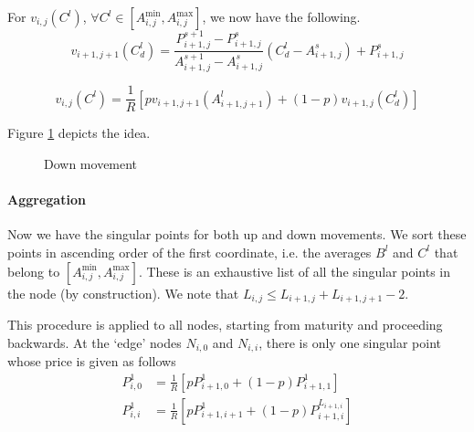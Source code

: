 For $ v_{i,j}( C^l ) $, $ \forall C^l \in \left[ A_{i,j}^{\min}, A_{i,j}^{\max} \right] $, we now have the following.
\begin{equation}
	\label{eq:asian-dn-lint}
	v_{i+1,j+1} \left( C^l_d \right) = \frac{ P_{i+1,j}^{s+1} - P_{i+1,j}^{s} }{ A_{i+1,j}^{s+1} - A_{i+1,j}^{s} } \left( C^l_d - A_{i+1,j}^{s} \right) + P_{i+1,j}^{s}
\end{equation}

\begin{equation}
	\label{eq:asian-dn-pr}
	v_{i,j}( C^l ) = \frac{1}{R} \left[ p v_{i+1,j+1} \left( A_{i+1,j+1}^l \right) + (1 - p) v_{i+1,j} \left( C^l_d \right) \right]
\end{equation}

Figure \ref{fig:asian-2tr-dn} depicts the idea.
\begin{figure}[h]
	
	\caption{Down movement}
	\label{fig:asian-2tr-dn}
\end{figure}


\paragraph{Aggregation}

Now we have the singular points for both up and down movements. We sort these points in ascending order of the first coordinate, i.e. the averages $ B^l $ and $ C^l $ that belong to $ \left[ A_{i,j}^{\min}, A_{i,j}^{\max} \right] $. These is an exhaustive list of all the singular points in the node (by construction). We note that $ L_{i,j} \le L_{i+1,j} + L_{i+1,j+1} - 2 $.

This procedure is applied to all nodes, starting from maturity and proceeding backwards. At the `edge' nodes $ N_{i,0} $ and $ N_{i,i} $, there is only one singular point whose price is given as follows
\begin{subequations}
	\label{eq:asian-terminal-nodes}
	\begin{align}
		P_{i,0}^1 &= \frac{1}{R} \left[ p P_{i+1,0}^1 + (1 - p) P_{i+1,1}^1 \right] \\
		P_{i,i}^1 &= \frac{1}{R} \left[ p P_{i+1,i+1}^1 + (1 - p) P_{i+1,i}^{L_{i+1,i}} \right]
	\end{align}
\end{subequations}

